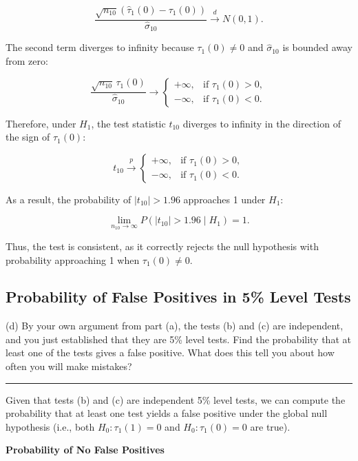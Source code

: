 \documentclass{article}
\newenvironment{colorparagraph}[1]{\par\color{#1}}{\par}
\begin{document}
\[
\frac{\sqrt{n_{10}} \left( \hat{\tau}_1(0) - \tau_1(0) \right)}{\hat{\sigma}_{10}} \xrightarrow{d} N(0,1).
\]

The second term diverges to infinity because \( \tau_1(0) \neq 0 \) and \( \hat{\sigma}_{10} \) is bounded away from zero:

\[
\frac{\sqrt{n_{10}} \, \tau_1(0)}{\hat{\sigma}_{10}} \to
\begin{cases}
+\infty, & \text{if } \tau_1(0) > 0, \\
-\infty, & \text{if } \tau_1(0) < 0.
\end{cases}
\]

Therefore, under \( H_1 \), the test statistic \( t_{10} \) diverges to infinity in the direction of the sign of \( \tau_1(0) \):

\[
t_{10} \xrightarrow{p}
\begin{cases}
+\infty, & \text{if } \tau_1(0) > 0, \\
-\infty, & \text{if } \tau_1(0) < 0.
\end{cases}
\]

As a result, the probability of \( |t_{10}| > 1.96 \) approaches 1 under \( H_1 \):

\[
\lim_{n_{10} \to \infty} P\left( |t_{10}| > 1.96 \mid H_1 \right) = 1.
\]

Thus, the test is consistent, as it correctly rejects the null hypothesis with probability approaching 1 when \( \tau_1(0) \neq 0 \).

\begin{colorparagraph}{questioncolor}
\label{q1d}\subsection{Probability of False Positives in 5\% Level Tests}
(d) By your own argument from part (a), the tests (b) and (c) are independent, and you just established that they are 5\% level tests. Find the probability that at least one of the tests gives a false positive. What does this tell you about how often you will make mistakes?

\rule{\textwidth}{0.5pt}
\end{colorparagraph}

Given that tests (b) and (c) are independent 5\% level tests, we can compute the probability that at least one test yields a false positive under the global null hypothesis (i.e., both \( H_0: \tau_1(1) = 0 \) and \( H_0: \tau_1(0) = 0 \) are true).

\textbf{Probability of No False Positives}
\end{document}
